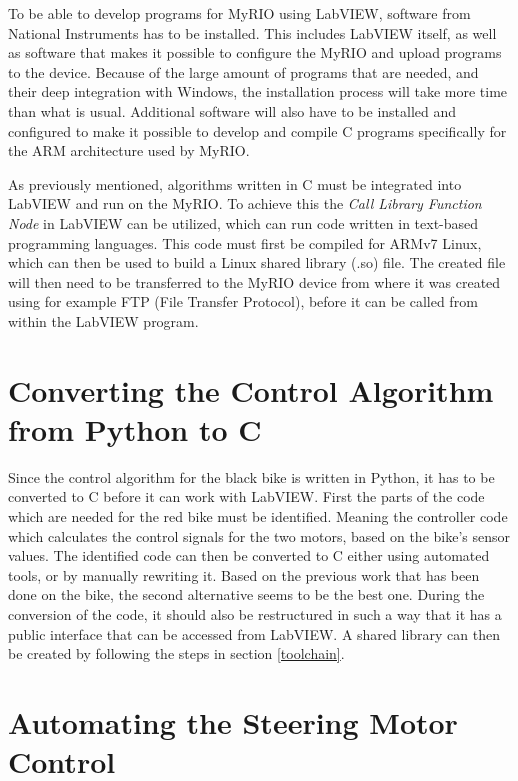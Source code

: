To be able to develop programs for MyRIO using LabVIEW, software from National Instruments has to be installed. This includes LabVIEW itself, as well as software that makes it possible to configure the MyRIO and upload programs to the device. Because of the large amount of programs that are needed, and their deep integration with Windows, the installation process will take more time than what is usual. Additional software will also have to be installed and configured to make it possible to develop and compile C programs specifically for the ARM architecture used by MyRIO.

As previously mentioned, algorithms written in C must be integrated into LabVIEW and run on the MyRIO. To achieve this the \textit{Call Library Function Node} in LabVIEW can be utilized, which can run code written in text-based programming languages. This code must first be compiled for ARMv7 Linux, which can then be used to build a Linux shared library (.so) file. The created file will then need to be transferred to the MyRIO device from where it was created using for example FTP (File Transfer Protocol), before it can be called from within the LabVIEW program.

\section{Converting the Control Algorithm from Python to C}
\label{convertingPython}

Since the control algorithm for the black bike is written in Python, it has to be converted to C before it can work with LabVIEW. First the parts of the code which are needed for the red bike must be identified. Meaning the controller code which calculates the control signals for the two motors, based on the bike's sensor values. The identified code can then be converted to C either using automated tools, or by manually rewriting it. Based on the previous work that has been done on the bike, the second alternative seems to be the best one. During the conversion of the code, it should also be restructured in such a way that it has a public interface that can be accessed from LabVIEW. A shared library can then be created by following the steps in section \ref{toolchain}.

\section{Automating the Steering Motor Control}
\label{steeringMotor}

